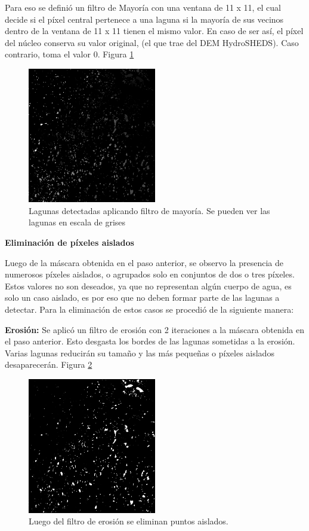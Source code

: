 \documentclass[10pt,a4paper, twoside]{report}
\begin{document}
Para eso se definió un filtro de Mayoría con una ventana de 11 x 11, el cual decide si el píxel central pertenece a una laguna si la mayoría de sus vecinos dentro de la ventana de 11 x 11 tienen el mismo valor. En caso de ser así, el píxel del núcleo conserva su valor original, (el que trae del DEM HydroSHEDS). Caso contrario, toma el valor 0. Figura \ref{filtroMayoria}

\begin{figure}[H]
   \centering      
   \includegraphics[width=0.5\textwidth]{imagenes/filtroMayoria.jpg}
 \caption{Lagunas detectadas aplicando filtro de mayoría. Se pueden ver las lagunas en escala de grises}
 \label{filtroMayoria}
\end{figure}

\textbf{Eliminación de píxeles aislados}

Luego de la máscara obtenida en el paso anterior, se observo la presencia de numerosos píxeles aislados, o agrupados solo en conjuntos de dos o tres píxeles. Estos valores no son deseados, ya que no representan algún cuerpo de agua, es solo un caso aislado, es por eso que no deben formar parte de las lagunas a detectar. Para la eliminación de estos casos se procedió de la siguiente manera:
		
		\textbf{Erosión:} Se aplicó un filtro de erosión con 2 iteraciones a la máscara obtenida en el paso anterior. Esto desgasta los bordes de las lagunas sometidas a la erosión. Varias lagunas reducirán su tamaño y las más pequeñas o píxeles aislados desaparecerán. Figura \ref{puntosAislados}
		
\begin{figure}[H]
   \centering      
   \includegraphics[width=0.5\textwidth]{imagenes/puntosAislados.jpg}
 \caption{Luego del filtro de erosión se eliminan puntos aislados.}
 \label{puntosAislados}
\end{figure}		
\end{document}
